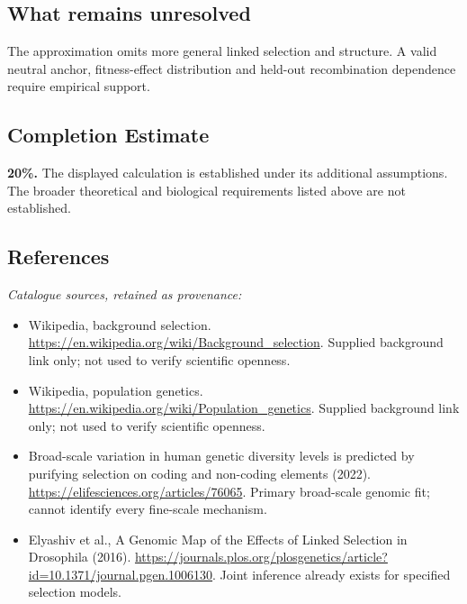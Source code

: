 \documentclass[11pt]{article}
\begin{document}
\subsection{What remains unresolved}
The approximation omits more general linked selection and structure. A valid neutral anchor, fitness-effect distribution and held-out recombination dependence require empirical support.
\subsection{Completion Estimate}
\textbf{20\%.} The displayed calculation is established under its additional assumptions. The broader theoretical and biological requirements listed above are not established.
\subsection{References}
\noindent\emph{Catalogue sources, retained as provenance:}
\begin{itemize}
\item Wikipedia, background selection. \url{https://en.wikipedia.org/wiki/Background_selection}. Supplied background link only; not used to verify scientific openness.
\item Wikipedia, population genetics. \url{https://en.wikipedia.org/wiki/Population_genetics}. Supplied background link only; not used to verify scientific openness.
\item Broad-scale variation in human genetic diversity levels is predicted by purifying selection on coding and non-coding elements (2022). \url{https://elifesciences.org/articles/76065}. Primary broad-scale genomic fit; cannot identify every fine-scale mechanism.
\item Elyashiv et al., A Genomic Map of the Effects of Linked Selection in Drosophila (2016). \url{https://journals.plos.org/plosgenetics/article?id=10.1371/journal.pgen.1006130}. Joint inference already exists for specified selection models.
\end{itemize}
\end{document}
